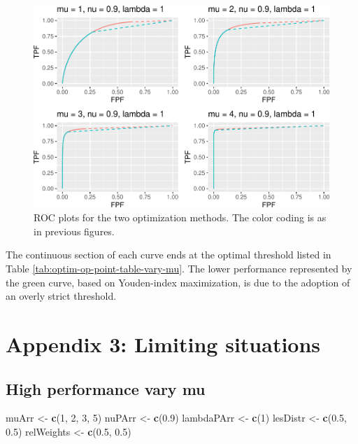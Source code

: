 \documentclass[
]{book}
\newenvironment{Shaded}{\begin{snugshade}}{\end{snugshade}}
\newcommand{\DecValTok}[1]{\textcolor[rgb]{0.00,0.00,0.81}{#1}}
\newcommand{\FloatTok}[1]{\textcolor[rgb]{0.00,0.00,0.81}{#1}}
\newcommand{\KeywordTok}[1]{\textcolor[rgb]{0.13,0.29,0.53}{\textbf{#1}}}
\newcommand{\NormalTok}[1]{#1}
\newcommand{\StringTok}[1]{\textcolor[rgb]{0.31,0.60,0.02}{#1}}
\begin{document}
\begin{figure}
\centering
\includegraphics{21-optim-op-point_files/figure-latex/optim-op-point-vary-mu-roc-1.pdf}
\caption{\label{fig:optim-op-point-vary-mu-roc}ROC plots for the two optimization methods. The color coding is as in previous figures.}
\end{figure}

The continuous section of each curve ends at the optimal threshold listed in Table \ref{tab:optim-op-point-table-vary-mu}. The lower performance represented by the green curve, based on Youden-index maximization, is due to the adoption of an overly strict threshold.

\hypertarget{tba-optim-op-point-limiting-situations}{%
\section{Appendix 3: Limiting situations}\label{tba-optim-op-point-limiting-situations}}

\hypertarget{optim-op-point-high-performance-vary-mu}{%
\subsection{High performance vary mu}\label{optim-op-point-high-performance-vary-mu}}

\begin{Shaded}
\begin{Highlighting}[]
\NormalTok{muArr <-}\StringTok{ }\KeywordTok{c}\NormalTok{(}\DecValTok{1}\NormalTok{, }\DecValTok{2}\NormalTok{, }\DecValTok{3}\NormalTok{, }\DecValTok{5}\NormalTok{)}
\NormalTok{nuPArr <-}\StringTok{ }\KeywordTok{c}\NormalTok{(}\FloatTok{0.9}\NormalTok{)}
\NormalTok{lambdaPArr <-}\StringTok{ }\KeywordTok{c}\NormalTok{(}\DecValTok{1}\NormalTok{)}
\NormalTok{lesDistr <-}\StringTok{ }\KeywordTok{c}\NormalTok{(}\FloatTok{0.5}\NormalTok{, }\FloatTok{0.5}\NormalTok{)}
\NormalTok{relWeights <-}\StringTok{ }\KeywordTok{c}\NormalTok{(}\FloatTok{0.5}\NormalTok{, }\FloatTok{0.5}\NormalTok{)}
\end{Highlighting}
\end{Shaded}
\end{document}
